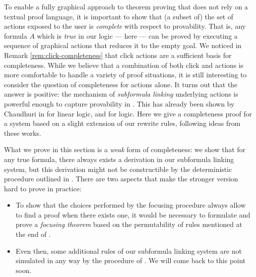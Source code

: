 To enable a fully graphical approach to theorem proving that does not rely on a
textual proof language, it is important to show that (a subset of) the set of
actions exposed to the user is \emph{complete} with respect to provability. That
is, any formula $A$ which is \emph{true} in our logic --- here 
 --- can be proved by executing a sequence of graphical actions that reduces
it to the empty goal. We noticed in Remark \ref{rem:click-completeness} that
click actions are a sufficient basis for completeness. While we believe that a
combination of both click and  actions is more comfortable to handle a
variety of proof situations, it is still interesting to consider the question of
completeness for  actions alone. It turns out that the answer is positive:
the mechanism of \emph{subformula linking} underlying  actions is powerful
enough to capture provability in . This has already been shown by Chaudhuri
in \cite{Chaudhuri2013} for linear logic, and \cite{DBLP:conf/cade/Chaudhuri21}
for  logic. Here we give a completeness proof for a system based
on a slight extension of our rewrite rules, following ideas from these works.

\begin{remark}
  What we prove in this section is a \emph{weak} form of completeness: we show
  that for any true formula, there always exists a derivation in our subformula
  linking system, but this derivation might not be constructible by the
  deterministic procedure outlined in . There are two aspects
  that make the stronger version hard to prove in practice:
  \begin{itemize}
    \item To show that the choices performed by the focusing procedure always
    allow to find a proof when there exists one, it would be necessary to
    formulate and prove a \emph{focusing theorem} based on the permutability of
    rules mentioned at the end of .
    \item Even then, some additional rules of our subformula linking system are
    not simulated in any way by the  procedure of . We will come
    back to this point soon.
  \end{itemize}  
\end{remark}

